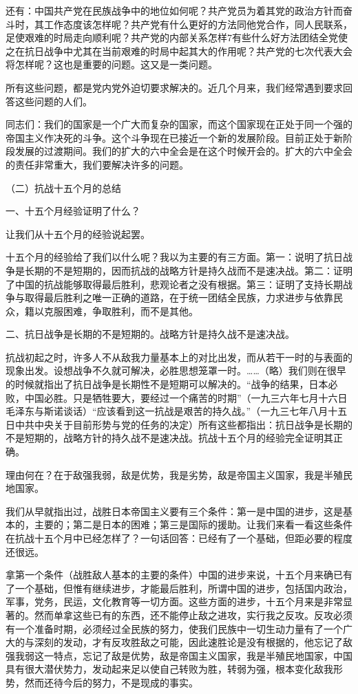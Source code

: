 还有：中国共产党在民族战争中的地位如何呢？共产党员为着其党的政治方针而奋斗时，其工作态度该怎样呢？共产党有什么更好的方法同他党合作，同人民联系，足使艰难的时局走向顺利呢？共产党的内部关系怎样7有些什么好方法团结全党使之在抗日战争中尤其在当前艰难的时局中起其大的作用呢？共产党的七次代表大会将怎样呢？这也是重要的问题。这又是一类问题。

所有这些问题，都是党内党外迫切要求解决的。近几个月来，我们经常遇到要求回答这些问题的人们。

同志们：我们的国家是一个广大而复杂的国家，而这个国家现在正处于同一个强的帝国主义作决死的斗争。这个斗争现在已接近一个新的发展阶段。目前正处于新阶段发展的过渡期间。我们的扩大的六中全会是在这个时候开会的。扩大的六中全会的责任非常重大，我们要解决许多的问题。

（二）抗战十五个月的总结

一、十五个月经验证明了什么？

让我们从十五个月的经验说起罢。

十五个月的经验给了我们以什么呢？我以为主要的有三方面。第一：说明了抗日战争是长期的不是短期的，因而抗战的战略方针是持久战而不是速决战。第二：证明了中国的抗战能够取得最后胜利，悲观论者之没有根据。第三：证明了支持长期战争与取得最后胜利之唯一正确的道路，在于统一团结全民族，力求进步与依靠民众，籍以克服困难，争取胜利，而不是其他。

二、抗日战争是长期的不是短期的。战略方针是持久战不是速决战。

抗战初起之时，许多人不从敌我力量基本上的对比出发，而从若干一时的与表面的现象出发。设想战争不久就可解决，必胜思想笼罩一时。……（略）我们则在很早的时候就指出了抗日战争是长期性不是短期可以解决的。“战争的结果，日本必败，中国必胜。只是牺牲要大，要经过一个痛苦的时期”（一九三六年七月十六日毛泽东与斯诺谈话）“应该看到这一抗战是艰苦的持久战。”（一九三七年八月十五日中共中央关于目前形势与党的任务的决定）所有这些都指出：抗日战争是长期的不是短期的，战略方针的持久战不是速决战。抗战十五个月的经验完全证明其正确。

理由何在？在于敌强我弱，敌是优势，我是劣势，敌是帝国主义国家，我是半殖民地国家。

我们从早就指出过，战胜日本帝国主义要有三个条件：第一是中国的进步，这是基本的，主要的；第二是日本的困难；第三是国际的援助。让我们来看一看这些条件在抗战十五个月中已经怎样了？一句话回答：已经有了一个基础，但距必要的程度还很远。

拿第一个条件（战胜敌人基本的主要的条件）中国的进步来说，十五个月来确已有了一个基础，但惟有继续进步，才能最后胜利，所谓中国的进步，包括国内政治，军事，党务，民运，文化教育等一切方面。这些方面的进步，十五个月来是非常显著的。然而单拿这些已有的东西，还不能停止敌之进攻，实行我之反攻。反攻必须有一个准备时期，必须经过全民族的努力，使我们民族中一切生动力量有了一个广大的与深刻的发动，才有反攻胜敌之可能，因此速胜论是没有根据的，他忘记了敌强我弱这一特点，忘记了敌是优势，敌是帝国主义国家，我是半殖民地国家，中国具有很大潜伏势力，发动起来足以使自己转败为胜，转弱为强，根本变化敌我形势，然而还待今后的努力，不是现成的事实。

